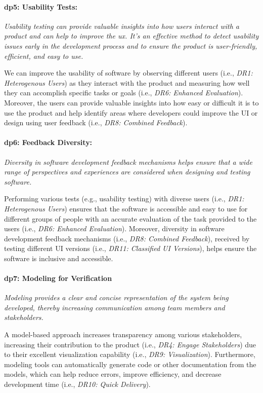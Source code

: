 \paragraph{\ac{dp}5: Usability Tests:} \textit{Usability testing can provide valuable insights into how users interact with a product and can help to improve the \ac{ux}. It's an effective method to detect usability issues early in the development process and to ensure the product is user-friendly, efficient, and easy to use.}

We can improve the usability of software by observing different users (i.e., \textit{DR1: Heterogenous Users}) as they interact with the product and measuring how well they can accomplish specific tasks or goals (i.e., \textit{DR6: Enhanced Evaluation}).
Moreover, the users can provide valuable insights into how easy or difficult it is to use the product and help identify areas where developers could improve the UI or design using user feedback (i.e., \textit{DR8: Combined Feedback}). 

\paragraph{\ac{dp}6: Feedback Diversity:} \textit{Diversity in software development feedback mechanisms helps ensure that a wide range of perspectives and experiences are considered when designing and testing software.}

Performing various tests (e.g., usability testing) with diverse users (i.e., \textit{DR1: Heterogenous Users}) ensures that the software is accessible and easy to use for different groups of people with an accurate evaluation of the task provided to the users (i.e., \textit{DR6: Enhanced Evaluation}).
Moreover, diversity in software development feedback mechanisms (i.e., \textit{DR8: Combined Feedback}), received by testing different UI versions (i.e., \textit{DR11: Classified UI Versions}), helps ensure the software is inclusive and accessible.

\paragraph{\ac{dp}7: Modeling for Verification} \textit{Modeling provides a clear and concise representation of the system being developed, thereby increasing communication among team members and stakeholders.}

A model-based approach increases transparency among various stakeholders, increasing their contribution to the product (i.e., \textit{DR4: Engage Stakeholders}) due to their excellent visualization capability (i.e., \textit{DR9: Visualization}).
Furthermore, modeling tools can automatically generate code or other documentation from the models, which can help reduce errors, improve efficiency, and decrease development time (i.e., \textit{DR10: Quick Delivery}).

